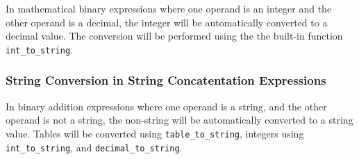 \documentclass[12pt]{article}
\begin{document}
In mathematical binary expressions where one operand is an integer and the other operand is a decimal, the integer will be automatically converted to a decimal value. The conversion will be performed using the the built-in function \texttt{int\_to\_string}.

\subsubsection*{String Conversion in String Concatentation Expressions}

In binary addition expressions where one operand is a string, and the other operand is not a string, the non-string will be automatically converted to a string value. Tables will be converted using \texttt{table\_to\_string}, integers using \texttt{int\_to\_string}, and \texttt{decimal\_to\_string}.
\end{document}
